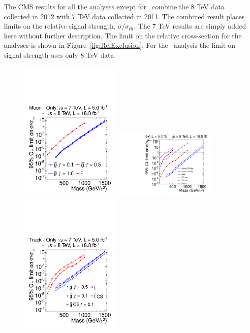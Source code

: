 The CMS results for all the analyses except for \muononly\ combine the 8 TeV data collected in 2012 with 7 TeV data collected in 2011.
The combined result places limits on
the relative signal strength, $\sigma/\sigma_{th}$. The 7 TeV results are simply added here without further description.
The limit on the relative cross-section
for the analyses is shown in Figure~\ref{fig:RelExclusion}. For the \muononly\ analysis the limit on signal strength uses only 8 TeV data.

\begin{figure}
\centering
  \includegraphics[clip=true, trim=0.0cm 0cm 2.8cm 0cm, width=0.44\textwidth]{figures/muonly/MOExclusionRelLog}
  \includegraphics[clip=true, trim=0.0cm 0cm 2.8cm 0cm, width=0.44\textwidth]{figures/tkmu/MuExclusionRelLog} \\
  \includegraphics[clip=true, trim=0.0cm 0cm 2.8cm 0cm, width=0.44\textwidth]{figures/tkonly/TkExclusionRelLog}

\end{figure}

